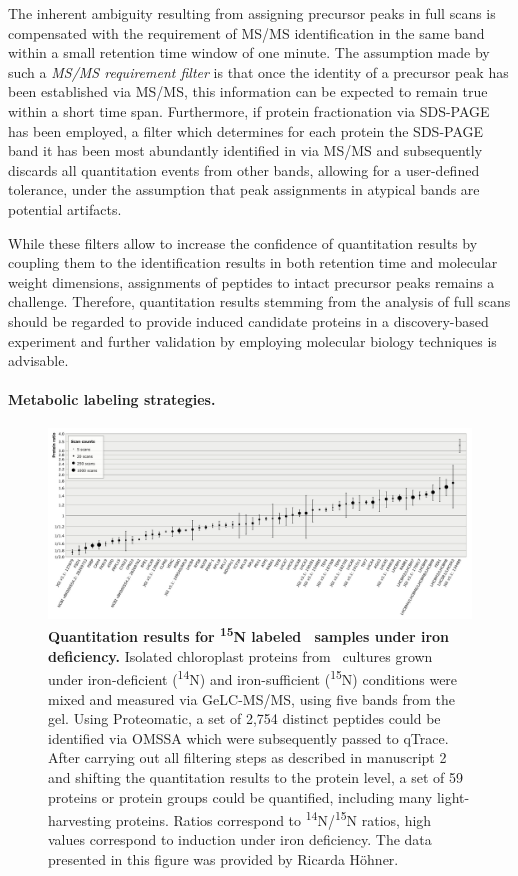 The inherent ambiguity resulting from assigning precursor peaks in full scans
is compensated with the requirement of MS/MS identification in the same band
within a small retention time window of one minute.
The assumption made by such a {\em MS/MS requirement filter} is that once the
identity of a precursor peak has been established via MS/MS, this information
can be expected to remain true within a short time span.
Furthermore, if protein fractionation via SDS-PAGE has been employed, a filter
which determines for each protein the SDS-PAGE band it has been most abundantly
identified in via MS/MS and subsequently discards all quantitation events
from other bands, allowing for a user-defined tolerance, under the assumption
that peak assignments in atypical bands are potential artifacts.

While these filters allow to increase the confidence of quantitation results
by coupling them to the identification results in both retention time and
molecular weight dimensions, assignments of peptides to intact precursor
peaks remains a challenge.
Therefore, quantitation results stemming from the analysis of full scans
should be regarded to provide induced candidate proteins in a discovery-based
experiment and further validation by employing molecular biology techniques
is advisable.

\paragraph{Metabolic labeling strategies.}

\begin{figure}
\includegraphics[width=\textwidth]{figures/qtrace-diagram.jpg}
\caption{
{\bf Quantitation results for \textsuperscript{15}N labeled \cre~samples
    under iron deficiency.} 
    Isolated chloroplast proteins from \cre~cultures grown under 
    iron-deficient (\textsuperscript{14}N) and iron-sufficient
    (\textsuperscript{15}N) conditions were mixed and measured via
    GeLC-MS/MS, using five bands from the gel.
    Using Proteomatic, a set of 2,754 distinct peptides could be identified
    via OMSSA which were subsequently passed to qTrace. 
    After carrying out all filtering steps as described in manuscript 2
    and shifting the quantitation results to the protein level,
    a set of 59 proteins or protein groups could be quantified,
    including many light-harvesting proteins.
    Ratios correspond to \textsuperscript{14}N/\textsuperscript{15}N ratios,
    high values correspond to induction under iron deficiency.
    The data presented in this figure was provided by Ricarda H\"ohner.
}
\label{fig:qtrace-15n}
\end{figure}

